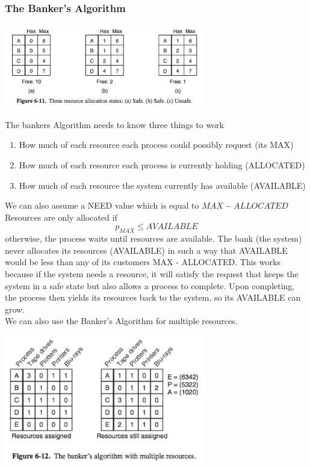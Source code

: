\documentclass{article}
\begin{document}
\subsubsection*{The Banker's Algorithm}
\begin{center}
\includegraphics[width= 250pt]{tex/ch6/6-11.png}
\end{center}
The bankers Algorithm needs to know three things to work
\begin{enumerate}
	\item How much of each resource each process could possibly request (its MAX)
	\item How much of each resource each process is currently holding (ALLOCATED)
	\item How much of each resource the system currently has available (AVAILABLE)
\end{enumerate}
We can also assume a NEED value which is equal to $MAX - ALLOCATED$
\\Resources are only allocated if 
$$p_{MAX} \leq AVAILABLE$$
otherwise, the process waits until resources are available. The bank (the system) never allocates its resources (AVAILABLE) in such a way that AVAILABLE would be less than any of its customers MAX - ALLOCATED. This works because if the system needs a resource, it will satisfy the request that keeps the system in a safe state but also allows a process to complete. Upon completing, the process then yields its resources back to the system, so its AVAILABLE can grow.
\\We can also use the Banker's Algorithm for multiple resources.
\begin{center}
\includegraphics[width= 250pt]{tex/ch6/6-12.png}
\end{center}
\end{document}
